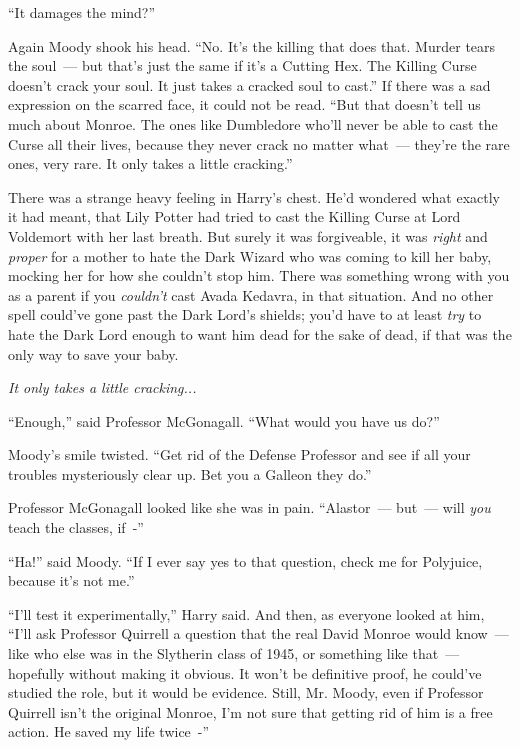 ``It damages the mind?''

Again Moody shook his head. ``No. It's the killing that does that. Murder tears the soul~--- but that's just the same if it's a Cutting Hex. The Killing Curse doesn't crack your soul. It just takes a cracked soul to cast.'' If there was a sad expression on the scarred face, it could not be read. ``But that doesn't tell us much about Monroe. The ones like Dumbledore who'll never be able to cast the Curse all their lives, because they never crack no matter what~--- they're the rare ones, very rare. It only takes a little cracking.''

There was a strange heavy feeling in Harry's chest. He'd wondered what exactly it had meant, that Lily Potter had tried to cast the Killing Curse at Lord Voldemort with her last breath. But surely it was forgiveable, it was \emph{right} and \emph{proper} for a mother to hate the Dark Wizard who was coming to kill her baby, mocking her for how she couldn't stop him. There was something wrong with you as a parent if you \emph{couldn't} cast Avada Kedavra, in that situation. And no other spell could've gone past the Dark Lord's shields; you'd have to at least \emph{try} to hate the Dark Lord enough to want him dead for the sake of dead, if that was the only way to save your baby.

\emph{It only takes a little cracking...}

``Enough,'' said Professor McGonagall. ``What would you have us do?''

Moody's smile twisted. ``Get rid of the Defense Professor and see if all your troubles mysteriously clear up. Bet you a Galleon they do.''

Professor McGonagall looked like she was in pain. ``Alastor~--- but~--- will \emph{you} teach the classes, if~-''

``Ha!'' said Moody. ``If I ever say yes to that question, check me for Polyjuice, because it's not me.''

``I'll test it experimentally,'' Harry said. And then, as everyone looked at him, ``I'll ask Professor Quirrell a question that the real David Monroe would know~--- like who else was in the Slytherin class of 1945, or something like that~--- hopefully without making it obvious. It won't be definitive proof, he could've studied the role, but it would be evidence. Still, Mr. Moody, even if Professor Quirrell isn't the original Monroe, I'm not sure that getting rid of him is a free action. He saved my life twice~-''

